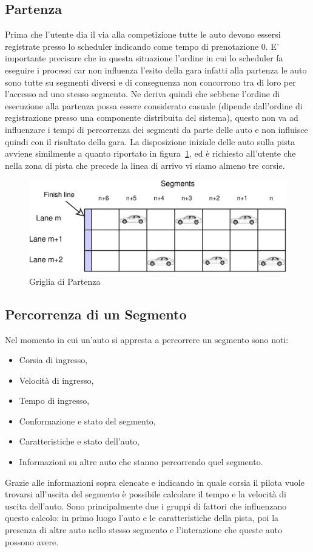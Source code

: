\documentclass[11pt,a4paper]{report}
\begin{document}
\subsection{Partenza}
Prima che l'utente dia il via alla competizione tutte le auto devono essersi registrate presso lo scheduler indicando come tempo di prenotazione 0.
E' importante precisare che in questa situazione l'ordine in cui lo scheduler fa eseguire i processi car non influenza l'esito della gara infatti alla partenza le auto sono tutte su segmenti diversi e di conseguenza non concorrono tra di loro per l'accesso ad uno stesso segmento. Ne deriva quindi che sebbene l'ordine di esecuzione alla partenza possa essere considerato casuale (dipende dall'ordine di registrazione presso una componente distribuita del sistema), questo non va ad influenzare i tempi di percorrenza dei segmenti da parte delle auto e non influisce quindi con il risultato della gara.
La disposizione iniziale delle auto sulla pista avviene similmente a quanto riportato in figura~\ref{fig:startGrid}, ed è richiesto all'utente che nella zona di pista che precede la linea di arrivo vi siamo almeno tre corsie.
\begin{figure}
\includegraphics[width=\textwidth]{diagrammi/StartGrid}
\caption{Griglia di Partenza}
\label{fig:startGrid}
\end{figure}
\subsection{Percorrenza di un Segmento}
\label{txt:percorrenza}
Nel momento in cui un'auto si appresta a percorrere un segmento sono noti:
\begin{itemize}
\item Corsia di ingresso,
\item Velocità di ingresso,
\item Tempo di ingresso,
\item Conformazione e stato del segmento,
\item Caratteristiche e stato dell'auto,
\item Informazioni su altre auto che stanno percorrendo quel segmento.
\end{itemize}
Grazie alle informazioni sopra elencate e indicando in quale corsia il pilota vuole trovarsi all'uscita del segmento è possibile calcolare il tempo e la velocità di uscita dell'auto. Sono principalmente due i gruppi di fattori che influenzano questo calcolo: in primo luogo l'auto e le caratteristiche della pista, poi la presenza di altre auto nello stesso segmento e l'interazione che queste auto possono avere.
\end{document}
